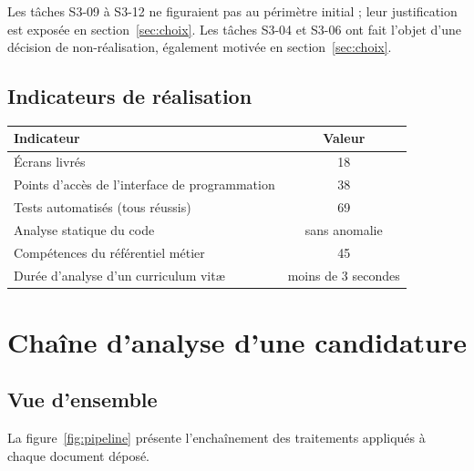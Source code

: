 \documentclass[11pt,a4paper]{article}
\begin{document}
\vspace{2mm}
\noindent Les tâches S3-09 à S3-12 ne figuraient pas au périmètre initial ; leur justification est exposée en section~\ref{sec:choix}. Les tâches S3-04 et S3-06 ont fait l'objet d'une décision de non-réalisation, également motivée en section~\ref{sec:choix}.

\subsection{Indicateurs de réalisation}

\begin{center}
\small
\begin{tabular}{lc}
  \toprule
  \textbf{Indicateur} & \textbf{Valeur} \\
  \midrule
  Écrans livrés & 18 \\
  Points d'accès de l'interface de programmation & 38 \\
  Tests automatisés (tous réussis) & 69 \\
  Analyse statique du code & sans anomalie \\
  Compétences du référentiel métier & 45 \\
  Durée d'analyse d'un curriculum vitæ & moins de 3 secondes \\
  \bottomrule
\end{tabular}
\end{center}

\section{Chaîne d'analyse d'une candidature}

\subsection{Vue d'ensemble}
La figure~\ref{fig:pipeline} présente l'enchaînement des traitements appliqués à chaque document déposé.
\end{document}
